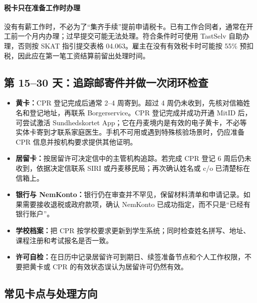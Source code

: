\paragraph{税卡只在准备工作时办理}
没有有薪工作时，不必为了“集齐手续”提前申请税卡。已有工作合同者，通常在开工前一个月内办理；过早提交可能无法处理。符合条件时可使用 TastSelv 自助办理，否则按 SKAT 指引提交表格 04.063。雇主在没有有效税卡时可能按 55\% 预扣税，因此应在第一笔工资结算前留出处理时间。

\subsection{第 15--30 天：追踪邮寄件并做一次闭环检查}

\begin{itemize}[leftmargin=2em,itemsep=3pt]
  \item \textbf{黄卡：}CPR 登记完成后通常 2--4 周寄到。超过 4 周仍未收到，先核对信箱姓名和登记地址，再联系 Borgerservice。CPR 登记完成并成功开通 MitID 后，可尝试激活 Sundhedskortet App；它在丹麦境内是有效的电子黄卡，不必等实体卡寄到才联系家庭医生。手机不可用或遇到特殊核验场景时，仍应准备 CPR 信息并按机构要求提供其他证明。
  \item \textbf{居留卡：}按居留许可决定信中的主管机构追踪。若完成 CPR 登记 6 周后仍未收到，依据决定信联系 SIRI 或丹麦移民局；再次确认姓名或 c/o 已清楚标在信箱上。
  \item \textbf{银行与 NemKonto：}银行仍在审查并不罕见，保留材料清单和申请记录。如果需要接收退税或政府款项，确认 NemKonto 已成功指定，而不只是“已经有银行账户”。
  \item \textbf{学校档案：}把 CPR 按学校要求更新到学生系统；同时检查姓名拼写、地址、课程注册和考试报名是否一致。
  \item \textbf{许可自检：}在日历中记录居留许可到期日、续签准备节点和个人工作权限，不要把黄卡或 CPR 的有效状态误认为居留许可仍然有效。
\end{itemize}

\subsection{常见卡点与处理方向}

